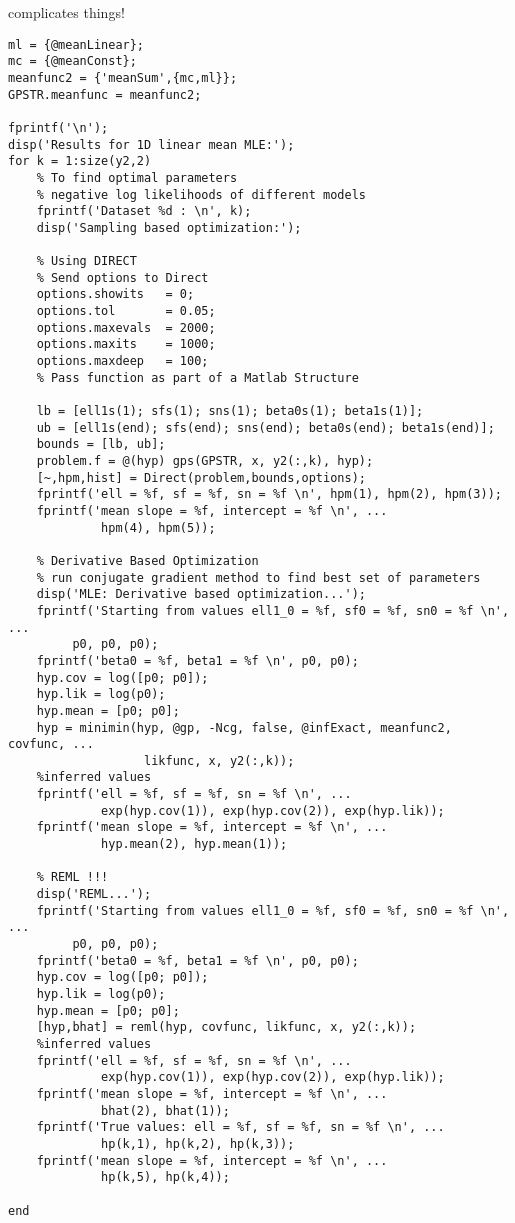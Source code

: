 \begin{par}
complicates things!
\end{par} \vspace{1em}
\begin{verbatim}
ml = {@meanLinear};
mc = {@meanConst};
meanfunc2 = {'meanSum',{mc,ml}};
GPSTR.meanfunc = meanfunc2;

fprintf('\n');
disp('Results for 1D linear mean MLE:');
for k = 1:size(y2,2)
    % To find optimal parameters
    % negative log likelihoods of different models
    fprintf('Dataset %d : \n', k);
    disp('Sampling based optimization:');

    % Using DIRECT
    % Send options to Direct
    options.showits   = 0;
    options.tol       = 0.05;
    options.maxevals  = 2000;
    options.maxits    = 1000;
    options.maxdeep   = 100;
    % Pass function as part of a Matlab Structure

    lb = [ell1s(1); sfs(1); sns(1); beta0s(1); beta1s(1)];
    ub = [ell1s(end); sfs(end); sns(end); beta0s(end); beta1s(end)];
    bounds = [lb, ub];
    problem.f = @(hyp) gps(GPSTR, x, y2(:,k), hyp);
    [~,hpm,hist] = Direct(problem,bounds,options);
    fprintf('ell = %f, sf = %f, sn = %f \n', hpm(1), hpm(2), hpm(3));
    fprintf('mean slope = %f, intercept = %f \n', ...
             hpm(4), hpm(5));

    % Derivative Based Optimization
    % run conjugate gradient method to find best set of parameters
    disp('MLE: Derivative based optimization...');
    fprintf('Starting from values ell1_0 = %f, sf0 = %f, sn0 = %f \n', ...
         p0, p0, p0);
    fprintf('beta0 = %f, beta1 = %f \n', p0, p0);
    hyp.cov = log([p0; p0]);
    hyp.lik = log(p0);
    hyp.mean = [p0; p0];
    hyp = minimin(hyp, @gp, -Ncg, false, @infExact, meanfunc2, covfunc, ...
                   likfunc, x, y2(:,k));
    %inferred values
    fprintf('ell = %f, sf = %f, sn = %f \n', ...
             exp(hyp.cov(1)), exp(hyp.cov(2)), exp(hyp.lik));
    fprintf('mean slope = %f, intercept = %f \n', ...
             hyp.mean(2), hyp.mean(1));

    % REML !!!
    disp('REML...');
    fprintf('Starting from values ell1_0 = %f, sf0 = %f, sn0 = %f \n', ...
         p0, p0, p0);
    fprintf('beta0 = %f, beta1 = %f \n', p0, p0);
    hyp.cov = log([p0; p0]);
    hyp.lik = log(p0);
    hyp.mean = [p0; p0];
    [hyp,bhat] = reml(hyp, covfunc, likfunc, x, y2(:,k));
    %inferred values
    fprintf('ell = %f, sf = %f, sn = %f \n', ...
             exp(hyp.cov(1)), exp(hyp.cov(2)), exp(hyp.lik));
    fprintf('mean slope = %f, intercept = %f \n', ...
             bhat(2), bhat(1));
    fprintf('True values: ell = %f, sf = %f, sn = %f \n', ...
             hp(k,1), hp(k,2), hp(k,3));
    fprintf('mean slope = %f, intercept = %f \n', ...
             hp(k,5), hp(k,4));

end
\end{verbatim}

